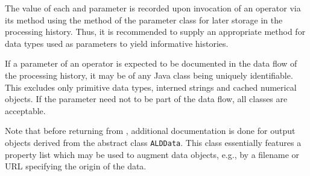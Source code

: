 The value of each  and  parameter is recorded
upon invocation of an operator via its  method using the method 
of the parameter class for later storage in the processing history.
Thus, it is recommended to supply an appropriate 
method for data types used as parameters to yield informative histories.

If a parameter of an operator is expected to be documented in the data flow of
the processing history, it
may be of any Java class being uniquely
identifiable. This excludes only primitive data types, interned strings
and cached numerical objects.
If the parameter need not to be part of the data flow, all classes are
acceptable.

Note that before returning from , additional documentation is
done for output objects derived from the abstract class \texttt{ALDData}.
This class essentially features a property list which may 
be used to augment data objects, e.g., by a filename or URL specifying 
the origin of the data.
